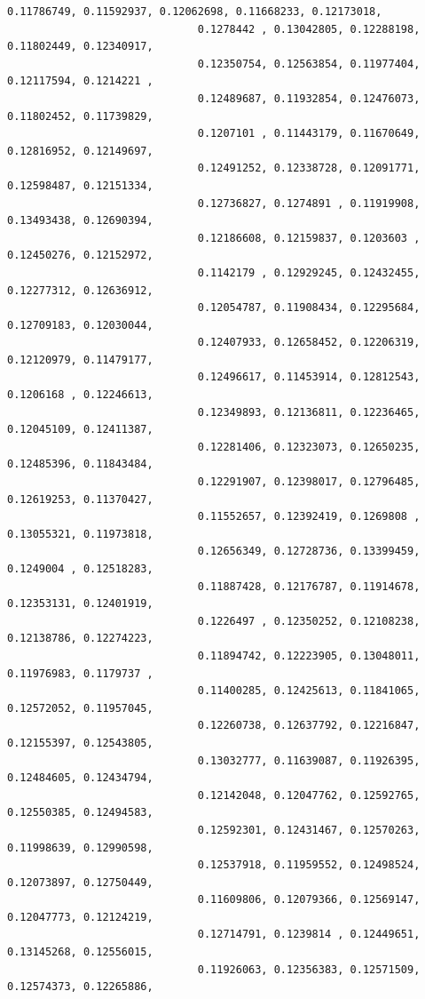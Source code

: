 \documentclass[11pt]{article}
\begin{document}
\begin{Verbatim}[commandchars=\\\{\}]
                              0.11786749, 0.11592937, 0.12062698, 0.11668233, 0.12173018,
                              0.1278442 , 0.13042805, 0.12288198, 0.11802449, 0.12340917,
                              0.12350754, 0.12563854, 0.11977404, 0.12117594, 0.1214221 ,
                              0.12489687, 0.11932854, 0.12476073, 0.11802452, 0.11739829,
                              0.1207101 , 0.11443179, 0.11670649, 0.12816952, 0.12149697,
                              0.12491252, 0.12338728, 0.12091771, 0.12598487, 0.12151334,
                              0.12736827, 0.1274891 , 0.11919908, 0.13493438, 0.12690394,
                              0.12186608, 0.12159837, 0.1203603 , 0.12450276, 0.12152972,
                              0.1142179 , 0.12929245, 0.12432455, 0.12277312, 0.12636912,
                              0.12054787, 0.11908434, 0.12295684, 0.12709183, 0.12030044,
                              0.12407933, 0.12658452, 0.12206319, 0.12120979, 0.11479177,
                              0.12496617, 0.11453914, 0.12812543, 0.1206168 , 0.12246613,
                              0.12349893, 0.12136811, 0.12236465, 0.12045109, 0.12411387,
                              0.12281406, 0.12323073, 0.12650235, 0.12485396, 0.11843484,
                              0.12291907, 0.12398017, 0.12796485, 0.12619253, 0.11370427,
                              0.11552657, 0.12392419, 0.1269808 , 0.13055321, 0.11973818,
                              0.12656349, 0.12728736, 0.13399459, 0.1249004 , 0.12518283,
                              0.11887428, 0.12176787, 0.11914678, 0.12353131, 0.12401919,
                              0.1226497 , 0.12350252, 0.12108238, 0.12138786, 0.12274223,
                              0.11894742, 0.12223905, 0.13048011, 0.11976983, 0.1179737 ,
                              0.11400285, 0.12425613, 0.11841065, 0.12572052, 0.11957045,
                              0.12260738, 0.12637792, 0.12216847, 0.12155397, 0.12543805,
                              0.13032777, 0.11639087, 0.11926395, 0.12484605, 0.12434794,
                              0.12142048, 0.12047762, 0.12592765, 0.12550385, 0.12494583,
                              0.12592301, 0.12431467, 0.12570263, 0.11998639, 0.12990598,
                              0.12537918, 0.11959552, 0.12498524, 0.12073897, 0.12750449,
                              0.11609806, 0.12079366, 0.12569147, 0.12047773, 0.12124219,
                              0.12714791, 0.1239814 , 0.12449651, 0.13145268, 0.12556015,
                              0.11926063, 0.12356383, 0.12571509, 0.12574373, 0.12265886,

\end{Verbatim}
\end{document}
